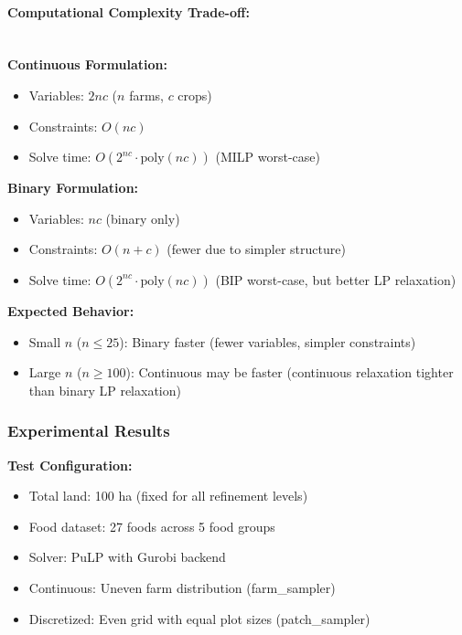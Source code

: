 \documentclass{oqireport}
\begin{document}
\paragraph{Computational Complexity Trade-off:}\\

\textbf{Continuous Formulation:}
\begin{itemize}
    \item Variables: $2nc$ ($n$ farms, $c$ crops)
    \item Constraints: $O(nc)$
    \item Solve time: $O(2^{nc} \cdot \text{poly}(nc))$ (MILP worst-case)
\end{itemize}

\textbf{Binary Formulation:}
\begin{itemize}
    \item Variables: $nc$ (binary only)
    \item Constraints: $O(n + c)$ (fewer due to simpler structure)
    \item Solve time: $O(2^{nc} \cdot \text{poly}(nc))$ (BIP worst-case, but better LP relaxation)
\end{itemize}

\textbf{Expected Behavior:}
\begin{itemize}
    \item Small $n$ ($n \leq 25$): Binary faster (fewer variables, simpler constraints)
    \item Large $n$ ($n \geq 100$): Continuous may be faster (continuous relaxation tighter than binary LP relaxation)
\end{itemize}

\subsubsection{Experimental Results}

\textbf{Test Configuration:}
\begin{itemize}
    \item Total land: 100 ha (fixed for all refinement levels)
    \item Food dataset: 27 foods across 5 food groups
    \item Solver: PuLP with Gurobi backend
    \item Continuous: Uneven farm distribution (farm\_sampler)
    \item Discretized: Even grid with equal plot sizes (patch\_sampler)
\end{itemize}
\end{document}

